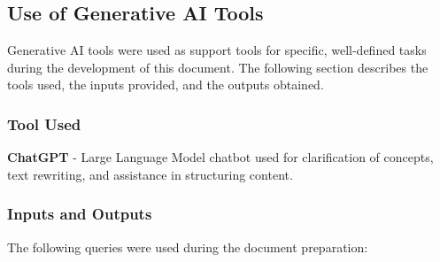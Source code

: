 \subsection{Use of Generative AI Tools}
\label{subsec:ai_tools}%

Generative AI tools were used as support tools for specific, well-defined tasks during the development of this document. The following section describes the tools used, the inputs provided, and the outputs obtained.

\subsubsection*{Tool Used}
\textbf{ChatGPT} - Large Language Model chatbot used for clarification of concepts, text rewriting, and assistance in structuring content.

\subsubsection*{Inputs and Outputs}

The following queries were used during the document preparation:

